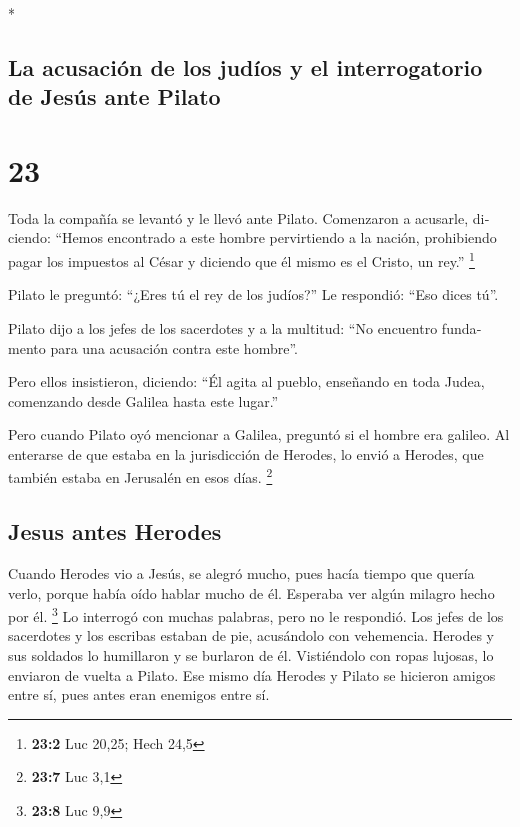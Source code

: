 \begin{paracol}{2}
\begin{otherlanguage}{english}
\switchcolumn[0]*

\hypertarget{la-acusaciuxf3n-de-los-juduxedos-y-el-interrogatorio-de-jesuxfas-ante-pilato}{%
\subsection{La acusación de los judíos y el interrogatorio de Jesús ante
Pilato}\label{la-acusaciuxf3n-de-los-juduxedos-y-el-interrogatorio-de-jesuxfas-ante-pilato}}

\hypertarget{section-27}{%
\section{23}\label{section-27}}

 Toda la compañía se levantó y le llevó ante Pilato.
 Comenzaron a acusarle, diciendo: ``Hemos encontrado a
este hombre pervirtiendo a la nación, prohibiendo pagar los impuestos al
César y diciendo que él mismo es el Cristo, un rey.'' \footnote{\textbf{23:2}
  Luc 20,25; Hech 24,5}

 Pilato le preguntó: ``¿Eres tú el rey de los judíos?'' Le
respondió: ``Eso dices tú''.

 Pilato dijo a los jefes de los sacerdotes y a la
multitud: ``No encuentro fundamento para una acusación contra este
hombre''.

 Pero ellos insistieron, diciendo: ``Él agita al pueblo,
enseñando en toda Judea, comenzando desde Galilea hasta este lugar.''

 Pero cuando Pilato oyó mencionar a Galilea, preguntó si
el hombre era galileo.  Al enterarse de que estaba en la
jurisdicción de Herodes, lo envió a Herodes, que también estaba en
Jerusalén en esos días. \footnote{\textbf{23:7} Luc 3,1}

\hypertarget{jesus-antes-herodes}{%
\subsection{Jesus antes Herodes}\label{jesus-antes-herodes}}

 Cuando Herodes vio a Jesús, se alegró mucho, pues hacía
tiempo que quería verlo, porque había oído hablar mucho de él. Esperaba
ver algún milagro hecho por él. \footnote{\textbf{23:8} Luc 9,9}
 Lo interrogó con muchas palabras, pero no le respondió.
 Los jefes de los sacerdotes y los escribas estaban de
pie, acusándolo con vehemencia.  Herodes y sus soldados
lo humillaron y se burlaron de él. Vistiéndolo con ropas lujosas, lo
enviaron de vuelta a Pilato.  Ese mismo día Herodes y
Pilato se hicieron amigos entre sí, pues antes eran enemigos entre sí.


\end{otherlanguage}
\end{paracol}
